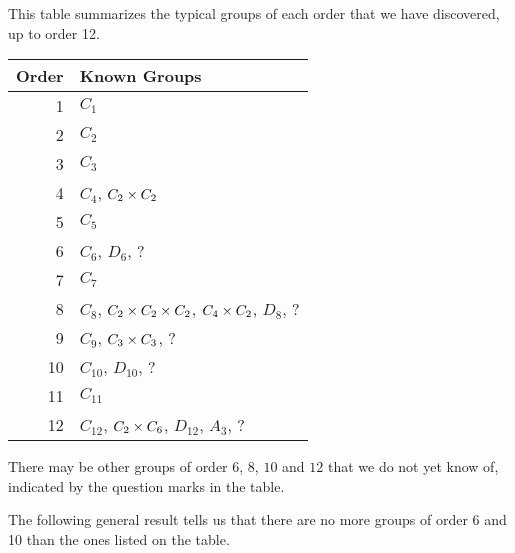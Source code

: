 This table summarizes the typical groups of each order that we have 
discovered, up to order 12.

\medskip

  \begin{tabular}{|r|l|}
  \hline
  \textbf{Order} & \textbf{Known Groups} \\
  \hline
    1 & $C_{1}$ \\
    2 & $C_{2}$ \\
    3 & $C_{3}$ \\
    4 & $C_{4}$, $C_{2} \times C_{2}$ \\
    5 & $C_{5}$ \\
    6 & $C_{6}$, $D_{6}$, ? \\
    7 & $C_{7}$ \\
    8 & $C_{8}$, $C_{2} \times C_{2} \times C_{2}$, $C_{4} \times C_{2}$, 
    $D_{8}$, ? \\
    9 & $C_{9}$, $C_{3} \times C_{3}$, ? \\
    10 & $C_{10}$, $D_{10}$, ? \\
    11 & $C_{11}$ \\
    12 & $C_{12}$, $C_{2} \times C_{6}$, $D_{12}$, $A_{3}$, ? \\
  \hline
  \end{tabular}

\medskip

There may be other groups of order $6$, $8$, $10$ and $12$ that we do
not yet know of, indicated by the question marks in the table.

The following general result tells us that there are no more groups of 
order 6 and 10 than the ones listed on the table.

